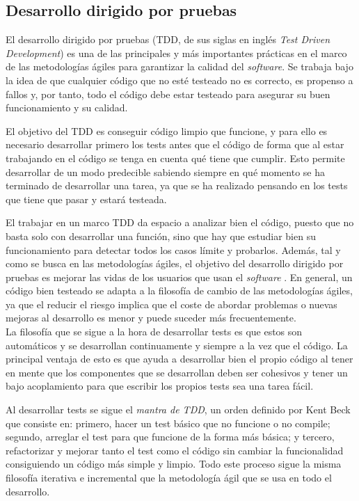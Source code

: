 \subsection{Desarrollo dirigido por pruebas}
El desarrollo dirigido por pruebas (TDD, de sus siglas en inglés \textit{Test
Driven Development}) es una de las principales y más importantes prácticas en el
marco de las metodologías ágiles para garantizar la calidad del
\textit{software}. Se trabaja bajo la idea de que cualquier código que no esté
testeado no es correcto, es propenso a fallos y, por tanto, todo el código debe
estar testeado para asegurar su buen funcionamiento y su calidad.

El objetivo del TDD es conseguir código limpio que funcione, y para ello es
necesario desarrollar primero los tests antes que el código de forma que al
estar trabajando en el código se tenga en cuenta qué tiene que cumplir. Esto
permite desarrollar de un modo predecible sabiendo siempre en qué momento se ha
terminado de desarrollar una tarea, ya que se ha realizado pensando en los tests
que tiene que pasar y estará testeada. 

El trabajar en un marco TDD da espacio a analizar bien el código, puesto que no
basta solo con desarrollar una función, sino que hay que estudiar bien su
funcionamiento para detectar todos los casos límite y probarlos. Además, tal y
como se busca en las metodologías ágiles, el objetivo del desarrollo dirigido
por pruebas es mejorar las vidas de los usuarios que usan el \textit{software}
\cite{beck2002driven}. En general, un código bien testeado se adapta a la
filosofía de cambio de las metodologías ágiles, ya que el reducir el riesgo
implica que el coste de abordar problemas o nuevas mejoras al desarrollo es
menor y puede suceder más frecuentemente.\\

La filosofía que se sigue a la hora de desarrollar tests es que estos son
automáticos y se desarrollan continuamente y siempre a la vez que el código. La
principal ventaja de esto es que ayuda a desarrollar bien el propio código al
tener en mente que los componentes que se desarrollan deben ser cohesivos y
tener un bajo acoplamiento para que escribir los propios tests sea una tarea
fácil.

Al desarrollar tests se sigue el \textit{mantra de TDD}, un orden definido por
Kent Beck \cite{beck2002driven} que consiste en: primero, hacer un test básico
que no funcione o no compile; segundo, arreglar el test para que funcione de la
forma más básica; y tercero, refactorizar y mejorar tanto el test como el código
sin cambiar la funcionalidad consiguiendo un código más simple y limpio. Todo
este proceso sigue la misma filosofía iterativa e incremental que la metodología
ágil que se usa en todo el desarrollo.\\

